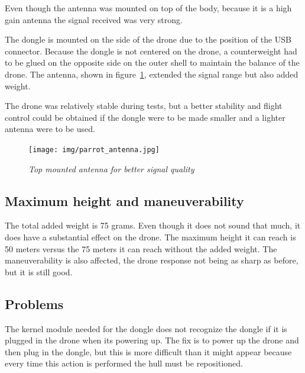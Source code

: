 Even though the antenna was mounted on top of the body, because it is a high gain antenna the signal received was very strong. 

The dongle is mounted on the side of the drone due to the position of the USB connector. Because the dongle is not centered on the drone, a counterweight had to be glued on the opposite side on the outer shell to maintain the balance of the drone. The antenna, shown in figure~\ref{fig:antenna}, extended the signal range but also added weight.

The drone was relatively stable during tests, but a better stability and flight control could be obtained if the dongle were to be made smaller and a lighter antenna were to be used.


\begin{figure}[ht]
\begin{center}
\texttt{[image: img/parrot\_antenna.jpg]}
\end{center}
\caption{\small \itshape{Top mounted antenna for better signal quality}}
  \label{fig:antenna}
\end{figure}



\subsection{Maximum height and maneuverability}

The total added weight is 75 grams. Even though it does not sound that much, it does have a substantial effect on the drone. The maximum height it can reach is 50 meters versus the 75 meters it can reach without the added weight. The maneuverability is also affected, the drone response not being as sharp as before, but it is still good.

\subsection{Problems}

The kernel module needed for the dongle does not recognize the dongle if it is plugged in the drone when its powering up. The fix is to power up the drone and then plug in the dongle, but this is more difficult than it might appear because every time this action is performed the hull must be repositioned.

\clearpage
